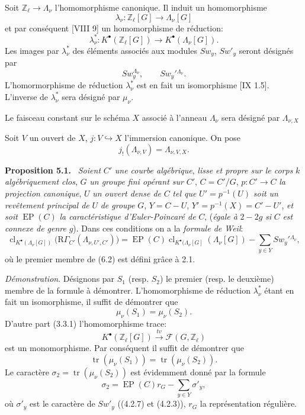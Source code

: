 \documentclass[11pt]{article}
\newenvironment{statement}[1]{\par\medskip\noindent\textbf{#1.}\ }{\par\medskip}
\providecommand{\EP}{\operatorname{EP}}
\providecommand{\EP}{\operatorname{EP}}
\providecommand{\clKstar}[1]{\operatorname{cl}_{K^{\bullet}(#1)}}
\begin{document}
Soit $\mathbb Z_\ell\to\Lambda_\nu$ l'homomorphisme canonique. Il induit un homomorphisme
\[
\lambda_\nu:\mathbb Z_\ell[G]\longrightarrow \Lambda_\nu[G]
\]
et par conséquent [VIII 9] un homomorphisme de réduction:
\[
\lambda_\nu^*:K^{\bullet}(\mathbb Z_\ell[G])\longrightarrow K^{\bullet}(\Lambda_\nu[G]).
\]
Les images par $\lambda_\nu^*$ des éléments associés aux modules $Sw_y$, $Sw'_y$ seront désignés par
\[
Sw_y^{\Lambda_\nu},\qquad Sw_y'{}^{\Lambda_\nu}.
\]
L'homormorphisme de réduction $\lambda_\nu^*$ est en fait un isomorphisme [IX 1.5]. L'inverse de $\lambda_\nu^*$ sera désigné par $\mu_\nu$.

Le faisceau constant sur le schéma $X$ associé à l'anneau $\Lambda_\nu$ sera désigné par $\Lambda_{\nu,X}$

Soit $V$ un ouvert de $X$, $j:V\hookrightarrow X$ l'immersion canonique. On pose
\[
j_!(\Lambda_{\nu,V})=\Lambda_{\nu,V,X}.
\]

\begin{statement}{Proposition 5.1}
\emph{Soient} $C'$ \emph{une courbe algébrique}, \emph{lisse et propre sur le corps} $k$ \emph{algébriquement clos}, $G$ \emph{un groupe fini opérant sur} $C'$, $C=C'/G$, $p:C'\to C$ \emph{la projection canonique}, $U$ \emph{un ouvert dense de} $C$ \emph{tel que} $U'=p^{-1}(U)$ \emph{soit un revêtement principal de} $U$ \emph{de groupe} $G$, $Y=C-U$, $Y'=p^{-1}(X)=C'-U'$, \emph{et soit} $\EP(C)$ \emph{la caractéristique d'Euler-Poincaré de} $C$, (\emph{égale à} $2-2g$ \emph{si} $C$ \emph{est connexe de genre} $g$).
Dans ces conditions on a la \emph{formule de Weil}:
\[
\clKstar{\Lambda_\nu[G]}\bigl(\mathrm{R}\Gamma_{C'}(\Lambda_{\nu,U',C'})\bigr)
=
\EP(C)\operatorname{cl}_{K^{\bullet}(\Lambda_\nu[G]}(\Lambda_\nu[G])
-\sum_{y\in Y}Sw_y'{}^{\Lambda_\nu},
\tag{5.2}
\]
où le premier membre de (6.2) est défini grâce à 2.1.
\end{statement}

\emph{Démonstration}. Désignons par $S_1$ (resp. $S_2$) le premier (resp. le deuxième) membre de la formule à démontrer. L'homomorphisme de réduction $\lambda_\nu^*$ étant en fait un isomorphisme, il suffit de démontrer que
\[
\mu_\nu(S_1)=\mu_\nu(S_2).
\]
D'autre part (3.3.1) l'homomorphisme trace:
\[
K^{\bullet}(\mathbb Z_\ell[G])\xrightarrow{\ tv\ }\mathcal F(G,\mathbb Z_\ell)
\]
est un monomorphisme. Par conséquent il suffit de démontrer que
\[
\operatorname{tr}(\mu_\nu(S_1))=\operatorname{tr}(\mu_\nu(S_2)).
\]
Le caractère $\sigma_2=\operatorname{tr}(\mu_\nu(S_2))$ est évidemment donné par la
formule
\[
\sigma_2=\EP(C)r_G-\sum_{y\in Y}\sigma'_y,
\tag{5.2.1}
\]
où $\sigma'_y$ est le caractère de $Sw'_y$ ((4.2.7) et (4.2.3)), $r_G$ la représentation régulière.
\end{document}
